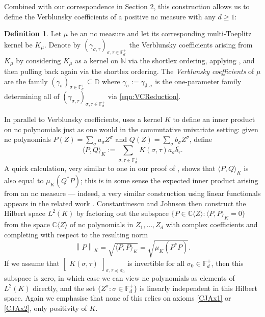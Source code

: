 \documentclass[11pt,reqno]{amsart}
\newcommand\norm[1]{\left\lVert#1\right\rVert}
\def\g{\gamma}
\def\s{\sigma}
\def\t{\tau}
\def\NN{\mathbb{N}}
\def\CC{\mathbb{C}}
\def\DD{\mathbb{D}}
\def\FF{\mathbb{F}}
\theoremstyle{definition}
\newtheorem{definition}[theorem]{Definition}
\numberwithin{equation}{section}
\begin{document}
Combined with our correspondence in Section 2, this construction allows us to define the Verblunsky coefficients of a positive nc measure with any \(d \geq 1\):

\begin{definition}
    \label{def:VerblunskyCoefficients}
    Let \(\mu\) be an nc measure and let its corresponding multi-Toeplitz kernel be \(K_\mu\). Denote by \((\g_{\s,\t})_{\s,\t\in\FF_d^+}\) the Verblunsky coefficients arising from \(K_\mu\) by considering \(K_\mu\) as a kernel on \(\NN\) via the shortlex ordering, applying \cite[Theorem 1.5.3]{Con96}, and then pulling back again via the shortlex ordering. The \emph{Verblunsky coefficients} of \(\mu\) are the family \((\g_{\s})_{\s \in \FF_d^+} \subseteq \DD\) where \(\g_{\s} := \g_{\emptyset,\s}\) is the one-parameter family determining all of \((\g_{\s,\t})_{\s,\t\in\FF_d^+}\) via \eqref{eqn:VCReduction}.
\end{definition}

In parallel to Verblunsky coefficients, \cite{CJ02b} uses a kernel \(K\) to define an inner product on nc polynomials just as one would in the commutative univariate setting: given nc polynomials \(P(Z) = \sum_\s a_\s Z^\s\) and \(Q(Z) = \sum_\s b_\s Z^\s\), define
\[
    \langle P, Q \rangle_K := \sum_{\s,\t \in \FF_d^+} K(\s,\t) a_\s \overline{b_\t}.
\]
A quick calculation, very similar to one in our proof of , shows that \(\langle P,Q\rangle_{K}\) is also equal to \(\mu_K(Q^*P)\); this is in some sense the expected inner product arising from an nc measure --- indeed, a very similar construction using linear functionals appears in the related work \cite{BMV23}. Constantinescu and Johnson \cite{CJ02b} then construct the Hilbert space \(L^2(K)\) by factoring out the subspace \(\{P \in \CC\langle Z \rangle : \langle P, P \rangle_K = 0\}\) from the space \(\CC\langle Z \rangle\) of nc polynomials in \(Z_1, \ldots, Z_d\) with complex coefficients and completing with respect to the resulting norm
\[
    \norm{P}_K = \sqrt{\langle P, P \rangle_K} = \sqrt{ \mu_K(P^*P) }.
\]
If we assume that \(\begin{bmatrix}K(\s,\t)\end{bmatrix}_{\s,\t \preceq \s_0}\) is invertible for all \(\s_0 \in \FF_d^+\), then this subspace is zero, in which case we can view nc polynomials as elements of \(L^2(K)\) directly, and the set \(\{Z^\s : \s \in \FF_d^+\}\) is linearly independent in this Hilbert space. Again we emphasise that none of this relies on axioms \eqref{CJAx1} or \eqref{CJAx2}, only positivity of \(K\).
\end{document}
